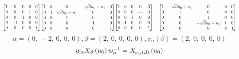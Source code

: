 \documentclass[11pt]{article}
\theoremstyle{definition}
\begin{document}
\[
\scaletoalign{\textwidth}{{\left[\begin{matrix}1 & 0 & 0 & 0 & 0\\0 & 0 & 0 & 1 & 0\\0 & 0 & 1 & 0 & 0\\0 & -1 & 0 & 0 & 0\\0 & 0 & 0 & 0 & 1\end{matrix}\right]} {\left[\begin{matrix}1 & 0 & 0 & - \sqrt{d} u_{0} + u_{1} & 0\\0 & 1 & \sqrt{d} u_{0} + u_{1} & 0 & 0\\0 & 0 & 1 & 0 & 0\\0 & 0 & 0 & 1 & 0\\0 & 0 & 0 & 0 & 1\end{matrix}\right]} {\left[\begin{matrix}1 & 0 & 0 & 0 & 0\\0 & 0 & 0 & -1 & 0\\0 & 0 & 1 & 0 & 0\\0 & 1 & 0 & 0 & 0\\0 & 0 & 0 & 0 & 1\end{matrix}\right]} = {\left[\begin{matrix}1 & - \sqrt{d} u_{0} + u_{1} & 0 & 0 & 0\\0 & 1 & 0 & 0 & 0\\0 & 0 & 1 & 0 & 0\\0 & 0 & - \sqrt{d} u_{0} - u_{1} & 1 & 0\\0 & 0 & 0 & 0 & 1\end{matrix}\right]}}
\]
\[
\alpha = \left( 0, \  -2, \  0, \  0, \  0\right), \beta = \left( 2, \  0, \  0, \  0, \  0\right), \sigma_{\alpha}(\beta) = \left( 2, \  0, \  0, \  0, \  0\right)
\]
\[
\scaletoalign{\textwidth}{w_{\alpha} X_{\beta}\left(u_{0}\right) w_{\alpha}^{-1} = X_{\sigma_{\alpha}\left(\beta\right)}\left(u_{0}\right)}
\]
\end{document}

